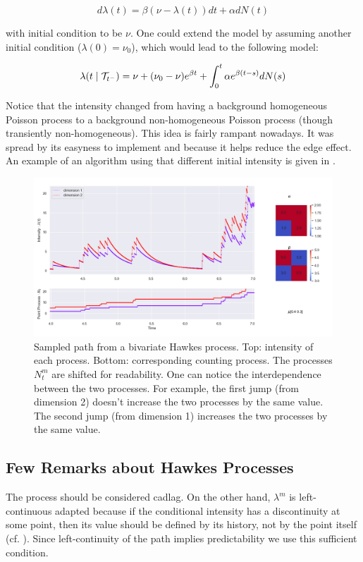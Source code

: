 $$ d \lambda (t) = \beta ( \nu - \lambda (t) ) dt + \alpha d N(t) $$

with initial condition to be $\nu$. One could extend the model by assuming another initial condition ($\lambda( 0 ) = \nu_0$), which would lead to the following model:

$$ \lambda(t \mid  \mathcal{T}_{t^-} ) = \nu +  ( \nu_0 - \nu )  e^{\beta t } +  \int_0^t \alpha e^{\beta ( t -s ) } d N(s) $$

Notice that the intensity changed from having a background homogeneous Poisson process to a background non-homogeneous Poisson process (though transiently non-homogeneous). This idea is fairly rampant nowadays. It was spread by its easyness to implement and because it helps reduce the edge effect. An example of an algorithm using that different initial intensity is given in \cite{simuldassios}.
\label{section:dassios}




\begin{figure}
\centering
\includegraphics[width = 0.99 \textwidth]{../imag/chap1/hawkes2.png}
\caption{Sampled path from a bivariate Hawkes process. Top: intensity of each process. Bottom: corresponding counting process. The processes $N_t^m$ are shifted for readability. One can notice the interdependence between the two processes. For example, the first jump (from dimension 2) doesn't increase the two processes by the same value. The second jump (from dimension 1) increases the two processes by the same value.}
\label{fig:hawkes2}
\end{figure}


\subsection{Few Remarks about Hawkes Processes}
\begin{remarque}
The process should be considered cadlag. On the other hand, $\lambda^m$ is left-continuous adapted because if the conditional intensity has a discontinuity at some point, then its value should be defined by its history, not by the point itself (cf. \cite{daley}). Since left-continuity of the path implies predictability we use this sufficient condition. 
\end{remarque}

